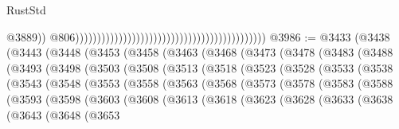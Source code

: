 \begin{lexlean}{RustStd}
\begin{coremodule}
{\begin{coremodule}
{{{{{{{{{{{{{{{{{{{{{{{{{{{{{{{{{{{{{{{{{{{{{{{{{{{{{{{                                                                                                @3889))
                                                                                            @806))))))))))))))))))))))))))))))))))))))))))))
@3986 := @3433
    (@3438
      (@3443
        (@3448
          (@3453
            (@3458
              (@3463
                (@3468
                  (@3473
                    (@3478
                      (@3483
                        (@3488
                          (@3493
                            (@3498
                              (@3503
                                (@3508
                                  (@3513
                                    (@3518
                                      (@3523
                                        (@3528
                                          (@3533
                                            (@3538
                                              (@3543
                                                (@3548
                                                  (@3553
                                                    (@3558
                                                      (@3563
                                                        (@3568
                                                          (@3573
                                                            (@3578
                                                              (@3583
                                                                (@3588
                                                                  (@3593
                                                                    (@3598
                                                                      (@3603
                                                                        (@3608
                                                                          (@3613
                                                                            (@3618
                                                                              (@3623
                                                                                (@3628
                                                                                  (@3633
                                                                                    (@3638
                                                                                      (@3643
                                                                                        (@3648
                                                                                          (@3653
}}}}}}}}}}}}}}}}}}}}}}}}}}}}}}}}}}}}}}}}}}}}}}}}}}}}}}}
\end{coremodule}}
\end{coremodule}
\end{lexlean}
